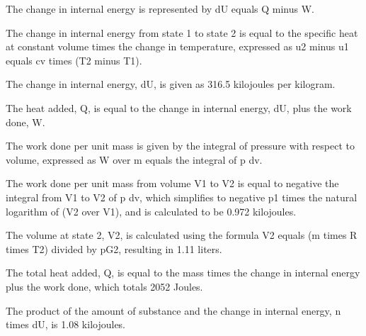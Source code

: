 The change in internal energy is represented by dU equals Q minus W.

The change in internal energy from state 1 to state 2 is equal to the specific heat at constant volume times the change in temperature, expressed as u2 minus u1 equals cv times (T2 minus T1).

The change in internal energy, dU, is given as 316.5 kilojoules per kilogram.

The heat added, Q, is equal to the change in internal energy, dU, plus the work done, W.

The work done per unit mass is given by the integral of pressure with respect to volume, expressed as W over m equals the integral of p dv.

The work done per unit mass from volume V1 to V2 is equal to negative the integral from V1 to V2 of p dv, which simplifies to negative p1 times the natural logarithm of (V2 over V1), and is calculated to be 0.972 kilojoules.

The volume at state 2, V2, is calculated using the formula V2 equals (m times R times T2) divided by pG2, resulting in 1.11 liters.

The total heat added, Q, is equal to the mass times the change in internal energy plus the work done, which totals 2052 Joules.

The product of the amount of substance and the change in internal energy, n times dU, is 1.08 kilojoules.